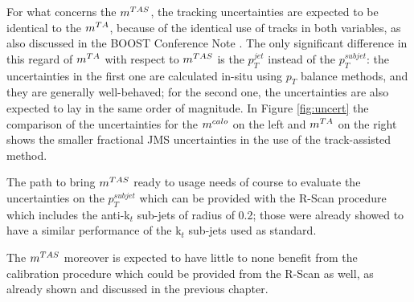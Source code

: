 For what concerns the $m^{TAS}$, the tracking uncertainties are expected to be identical to the $m^{TA}$, because of the identical use of tracks in both variables, as also discussed in the BOOST Conference Note \cite{art35}.
The only significant difference in this regard of $m^{TA}$ with respect to $m^{TAS}$ is the $p_T^{jet}$ instead of the $p_T^{subjet}$: the uncertainties in the first one are calculated in-situ using $p_T$ balance methods, and they are generally well-behaved; for the second one, the uncertainties are also expected to lay in the same order of magnitude. In Figure \ref{fig:uncert} the comparison of the uncertainties for the $m^{calo}$ on the left and $m^{TA}$ on the right shows the smaller fractional JMS uncertainties in the use of the track-assisted method.

The path to bring $m^{TAS}$ ready to usage needs of course to evaluate the uncertainties on the  $p_T^{subjet}$ which can be provided with the R-Scan procedure which includes the anti-k$_t$ sub-jets of radius of 0.2; those were already showed to have a similar performance of the k$_t$ sub-jets used as standard.

The $m^{TAS}$ moreover is expected to have little to none benefit from the calibration procedure which could be provided from the R-Scan as well, as already shown and discussed in the previous chapter. 










